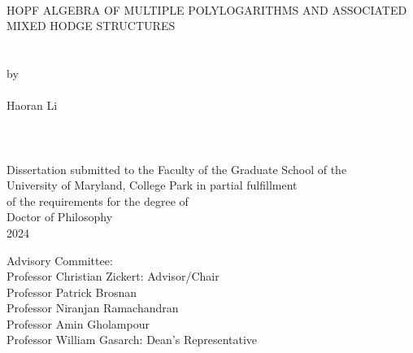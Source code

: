 
\thispagestyle{empty}
\hbox{\ }
\vspace{1in}
\renewcommand{\baselinestretch}{1}
\small\normalsize
\begin{center}

\large{{HOPF ALGEBRA OF MULTIPLE POLYLOGARITHMS AND ASSOCIATED MIXED HODGE STRUCTURES}}\\
\ \\
\ \\
\large{by} \\
\ \\
\large{Haoran Li}
\ \\
\ \\
\ \\
\ \\
\normalsize
Dissertation submitted to the Faculty of the Graduate School of the \\
University of Maryland, College Park in partial fulfillment \\
of the requirements for the degree of \\
Doctor of Philosophy \\
2024
\end{center}

\vspace{7.5em}

\noindent Advisory Committee: \\
Professor Christian Zickert: Advisor/Chair \\
Professor Patrick Brosnan \\
Professor Niranjan Ramachandran \\
Professor Amin Gholampour \\
Professor William Gasarch: Dean's Representative
